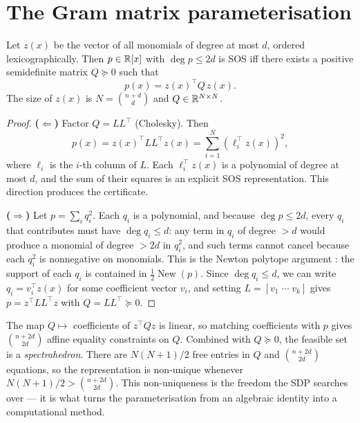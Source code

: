 \documentclass[11pt]{article}
\begin{document}
\section{The Gram matrix parameterisation}
\begin{proposition}
  Let $z(x)$ be the vector of all monomials of degree at most $d$, ordered
  lexicographically. Then $p \in \mathbb{R}[x]$ with $\deg p \le 2d$ is SOS iff
  there exists a positive semidefinite matrix $Q \succeq 0$ such that
  \begin{equation}\label{eq:gram}
    p(x) = z(x)^\top Q \, z(x).
  \end{equation}
  The size of $z(x)$ is $N = \binom{n+d}{d}$ and $Q \in \mathbb{R}^{N \times N}$.
\end{proposition}
\begin{proof}
  \noindent\textbf{($\Leftarrow$)} Factor $Q = L L^\top$ (Cholesky). Then
  \begin{equation}
    p(x) = z(x)^\top L L^\top z(x) = \sum_{i=1}^{N} (\ell_i^\top z(x))^2,
  \end{equation}
  where $\ell_i$ is the $i$-th column of $L$. Each $\ell_i^\top z(x)$ is a
  polynomial of degree at most $d$, and the sum of their squares is an
  explicit SOS representation. This direction produces the certificate.

  \noindent\textbf{($\Rightarrow$)} Let $p = \sum_i q_i^2$. Each $q_i$ is a
  polynomial, and because $\deg p \le 2d$, every $q_i$ that contributes
  must have $\deg q_i \le d$: any term in $q_i$ of degree $> d$ would
  produce a monomial of degree $> 2d$ in $q_i^2$, and such terms cannot
  cancel because each $q_i^2$ is nonnegative on monomials. This is the
  Newton polytope argument \cite{Reznick1978}: the support of each $q_i$
  is contained in $\frac{1}{2}\operatorname{New}(p)$. Since $\deg q_i \le d$,
  we can write $q_i = v_i^\top z(x)$ for some coefficient vector $v_i$, and
  setting $L = [v_1\; \cdots\; v_k]$ gives $p = z^\top L L^\top z$ with
  $Q = L L^\top \succeq 0$.
\end{proof}

\begin{remark}
  The map $Q \mapsto$ coefficients of $z^\top Q z$ is linear, so matching
  coefficients with $p$ gives $\binom{n+2d}{2d}$ affine equality constraints
  on $Q$. Combined with $Q \succeq 0$, the feasible set is a
  \emph{spectrahedron}. There are $N(N+1)/2$ free entries in $Q$ and
  $\binom{n+2d}{2d}$ equations, so the representation is non-unique
  whenever $N(N+1)/2 > \binom{n+2d}{2d}$. This non-uniqueness is the
  freedom the SDP searches over --- it is what turns the parameterisation
  from an algebraic identity into a computational method.
\end{remark}
\end{document}
